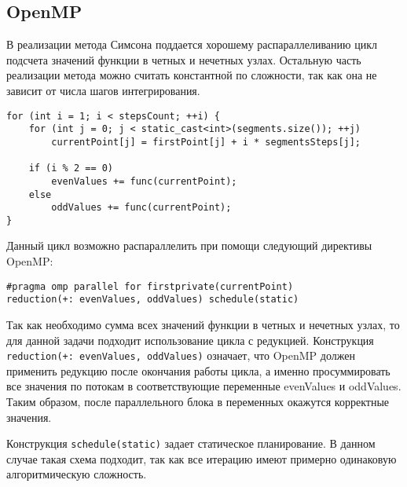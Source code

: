 \documentclass{report}
\begin{document}
\subsection*{OpenMP}
В реализации метода Симсона поддается хорошему распараллеливанию цикл подсчета значений функции в четных и нечетных узлах. Остальную часть реализации метода можно считать константной по сложности, так как она не зависит от числа шагов интегрирования.
\begin{lstlisting}
for (int i = 1; i < stepsCount; ++i) {
    for (int j = 0; j < static_cast<int>(segments.size()); ++j)
        currentPoint[j] = firstPoint[j] + i * segmentsSteps[j];

    if (i % 2 == 0)
        evenValues += func(currentPoint);
    else
        oddValues += func(currentPoint);
}
\end{lstlisting}
\par Данный цикл возможно распараллелить при помощи следующий директивы OpenMP:
\par \verb|#pragma omp parallel for firstprivate(currentPoint)|\\
\verb|reduction(+: evenValues, oddValues) schedule(static)|
\par Так как необходимо сумма всех значений функции в четных и нечетных узлах, то для данной задачи подходит использование цикла с редукцией. Конструкция \verb|reduction(+: evenValues, oddValues)| означает, что OpenMP должен применить редукцию после окончания работы цикла, а именно просуммировать все значения по потокам в соответствующие переменные evenValues и oddValues. Таким образом, после параллельного блока в переменных окажутся корректные значения.
\par Конструкция \verb|schedule(static)| задает статическое планирование. В данном случае такая схема подходит, так как все итерацию имеют примерно одинаковую алгоритмическую сложность.
\end{document}
